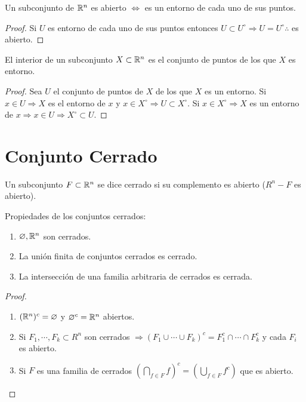 \begin{prop}
  Un subconjunto de $\mathbb{R}^n$ es abierto $\iff$ es un entorno de cada uno de sus puntos.
  \begin{proof}
    Si $U$ es entorno de cada uno de sus puntos entonces $U \subset U^{\circ} \Rightarrow U = U^{\circ} \therefore$ es abierto.
  \end{proof}
\end{prop}

\begin{prop}
  El interior de un subconjunto $X \subset \mathbb{R}^n$ es el conjunto de puntos de los que $X$ es entorno.
  \begin{proof}
    Sea $U$ el conjunto de puntos de $X$ de los que $X$ es un entorno. Si $x \in U \Rightarrow X$ es el entorno de $x$ y $x \in X^{\circ} \Rightarrow U \subset X^{\circ}$. Si $x \in X^{\circ} \Rightarrow X$ es un entorno de $x \Rightarrow x \in U \Rightarrow X^{\circ} \subset U$.
  \end{proof}
\end{prop}

\section{Conjunto Cerrado}

\begin{definition}
  Un subconjunto $F \subset \mathbb{R}^n$ se dice cerrado si su complemento es abierto ($R^n - F$ es abierto).
\end{definition}


\begin{prop}
  Propiedades de los conjuntos cerrados:
  \begin{enumerate}
    \item $\varnothing, \mathbb{R}^n$ son cerrados.
    \item La unión finita de conjuntos cerrados es cerrado.
    \item La intersección de una familia arbitraria de cerrados es cerrada.
  \end{enumerate}
  \begin{proof}
    \begin{enumerate}
      \item $(\mathbb{R}^n)^c = \varnothing$ y $\varnothing^c = \mathbb{R}^n$ abiertos.
      \item Si $F_1, \cdots, F_k \subset R^n$ son cerrados $\Rightarrow (F_1 \cup \cdots \cup F_k)^c = F_1^c \cap \cdots \cap F_k^c$ y cada $F_i$ es abierto.
      \item Si $F$ es una familia de cerrados $(\bigcap_{f \in F} f)^c = (\bigcup_{f \in F} f^c)$ que es abierto.
    \end{enumerate}
  \end{proof}
\end{prop}

